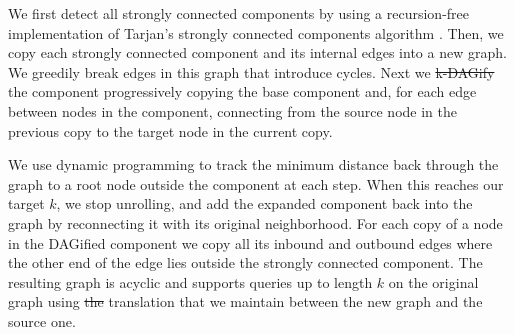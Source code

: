 \documentclass[a4paper,12pt,numbered,oneside]{Classes/PhDThesisPSnPDF}
\providecommand{\DIFaddtex}[1]{{\protect\color{blue}\uwave{#1}}} %
\providecommand{\DIFdeltex}[1]{{\protect\color{red}\sout{#1}}}                      %
\providecommand{\DIFaddbegin}{} %
\providecommand{\DIFaddend}{} %
\providecommand{\DIFdelbegin}{} %
\providecommand{\DIFdelend}{} %
\providecommand{\DIFadd}[1]{\texorpdfstring{\DIFaddtex{#1}}{#1}} %
\providecommand{\DIFdel}[1]{\texorpdfstring{\DIFdeltex{#1}}{}} %
\begin{document}
We first detect all strongly connected components by using a recursion-free implementation of Tarjan's strongly connected components algorithm \cite{tarjan1972depth}.
Then, we copy each strongly connected component and its internal edges into a new graph.
We greedily break edges in this graph that introduce cycles.
Next we \DIFdelbegin \DIFdel{k-DAGify }\DIFdelend \DIFaddbegin \DIFadd{$k$-DAGify }\DIFaddend the component progressively copying the base component and, for each edge between nodes in the component, connecting from the source node in the previous copy to the target node in the current copy.

We use dynamic programming to track the minimum distance back through the graph to a root node outside the component at each step.
When this reaches our target $k$, we stop unrolling, and add the expanded component back into the graph by reconnecting it with its original neighborhood.
For each copy of a node in the DAGified component we copy all its inbound and outbound edges where the other end of the edge lies outside the strongly connected component.
The resulting graph is acyclic and supports queries up to length $k$ on the original graph using \DIFdelbegin \DIFdel{the }\DIFdelend \DIFaddbegin \DIFadd{a }\DIFaddend translation that we maintain between the new graph and the source one.
\end{document}
